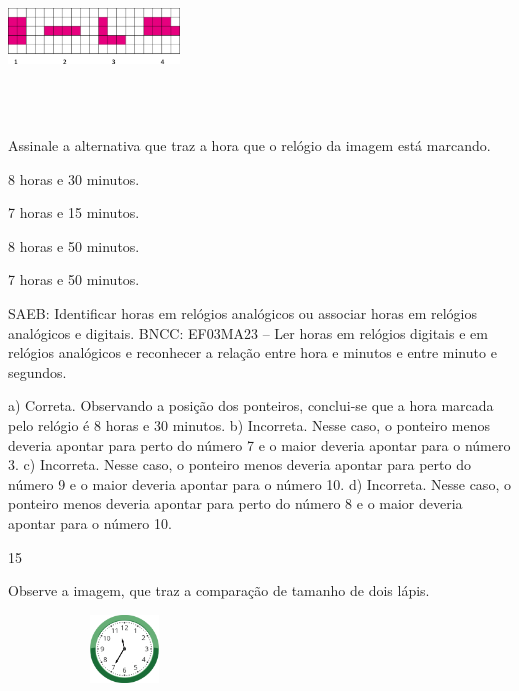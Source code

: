 {\begin{escolha}
{%

\includegraphics[width=1.79182in,height=1.69181in]{media/image115.png}

Assinale a alternativa que traz a hora que o relógio da imagem está marcando.

\begin{escolha}
\item
  8 horas e 30 minutos.
\item
  7 horas e 15 minutos.
\item
  8 horas e 50 minutos.
\item
  7 horas e 50 minutos.
\end{escolha}

SAEB: Identificar horas em relógios analógicos ou associar
horas em relógios analógicos e digitais.
BNCC: EF03MA23 – Ler horas em relógios digitais e em relógios analógicos e reconhecer a relação
entre hora e minutos e entre minuto e segundos.


a) Correta. Observando a posição dos ponteiros, conclui-se que a hora marcada pelo
relógio é 8 horas e 30 minutos.
b) Incorreta. Nesse caso, o ponteiro menos deveria apontar para perto do número 7 e o maior deveria apontar para o número 3.
c) Incorreta. Nesse caso, o ponteiro menos deveria apontar para perto do número 9 e o maior deveria apontar para o número 10.
d) Incorreta. Nesse caso, o ponteiro menos deveria apontar para perto do número 8 e o maior deveria apontar para o número 10.

\num{15}

Observe a imagem, que traz a comparação de tamanho de dois lápis.


\includegraphics[width=2.43137in,height=0.71356in]{media/image116.png}

}
\end{escolha}}

